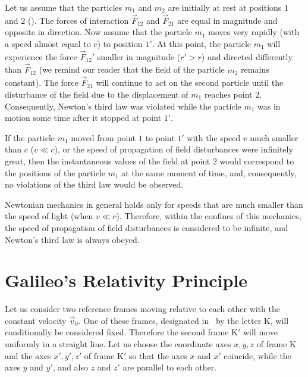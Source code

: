Let us assume that the particles $m_1$ and $m_2$ are initially at rest at positions $1$ and $2$ (). The forces of interaction $\vec{F}_{12}$ and $\vec{F}_{21}$ are equal in magnitude and opposite in direction. Now assume that the particle $m_1$ moves very rapidly (with a speed almost equal to $c$) to position $1'$. At this point, the particle $m_1$ will experience the force $\vec{F}_{12}'$ smaller in magnitude ($r'>r$) and directed differently than $\vec{F}_{12}$ (we remind our reader that the field of the particle $m_2$ remains constant). The force $\vec{F}_{21}$ will continue to act on the second particle until the disturbance of the field due to the displacement of $m_1$ reaches point $2$. Consequently, Newton's third law was violated while the particle $m_1$ was in motion some time after it stopped at point $1'$.

If the particle $m_1$ moved from point $1$ to point $1'$ with the speed $v$ much smaller than $c$ ($v\ll c$), or the speed of propagation of field disturbances were infinitely great, then the instantaneous values of the field at point $2$ would correspond to the positions of the particle $m_1$ at the same moment of time, and, consequently, no violations of the third law would be observed.

Newtonian mechanics in general holds only for speeds that are much smaller than the speed of light (when $v\ll c$). Therefore, within the confines of this mechanics, the speed of propagation of field disturbances is considered to be infinite, and Newton's third law is always obeyed.

\section{Galileo's Relativity Principle}\label{sec:2_7}

Let us consider two reference frames moving relative to each other with the constant velocity $\vec{v}_0$. One of these frames, designated in~ by the letter K, will conditionally be considered fixed. Therefore the second frame K$'$ will move uniformly in a straight line. Let us choose the coordinate axes $x, y, z$ of frame K and the axes $x',y',z'$ of frame K$'$ so that the axes $x$ and $x'$ coincide, while the axes $y$ and $y'$, and also $z$ and $z'$ are parallel to each other.

